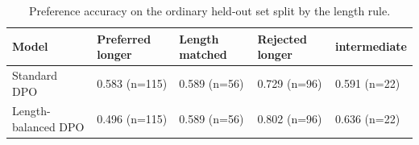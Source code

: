 \begin{table}[t]
\centering
\small
\caption{Preference accuracy on the ordinary held-out set split by the length rule.}
\begin{tabular}{lllll}
\toprule
Model & Preferred longer & Length matched & Rejected longer & intermediate \\
\midrule
Standard DPO & 0.583 (n=115) & 0.589 (n=56) & 0.729 (n=96) & 0.591 (n=22) \\
Length-balanced DPO & 0.496 (n=115) & 0.589 (n=56) & 0.802 (n=96) & 0.636 (n=22) \\
\bottomrule
\end{tabular}
\end{table}
